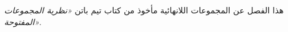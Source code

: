 \documentclass[../../../include/open-logic-chapter]{subfiles}
\begin{document}

\begin{editorial}
هذا الفصل عن المجموعات اللانهائية مأخوذ من كتاب تيم باتن
\emph{«نظرية المجموعات المفتوحة»}.
\end{editorial}

\end{document}
